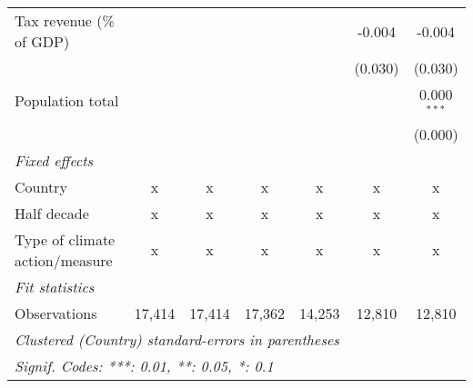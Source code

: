\begin{tabular}{lcccccc}
   Tax revenue (\% of GDP)                              &         &         &         &                & -0.004         & -0.004\\   
                                                        &         &         &         &                & (0.030)        & (0.030)\\   
   Population total                                     &         &         &         &                &                & 0.000$^{***}$\\   
                                                        &         &         &         &                &                & (0.000)\\   
   \emph{Fixed effects}\\
   Country                                              & x       & x       & x       & x              & x              & x\\  
   Half decade                                          & x       & x       & x       & x              & x              & x\\  
   Type of climate action/measure                       & x       & x       & x       & x              & x              & x\\  
   \midrule \emph{Fit statistics}\\
   Observations                                         & 17,414  & 17,414  & 17,362  & 14,253         & 12,810         & 12,810\\  
   \midrule
   \multicolumn{7}{l}{\emph{Clustered (Country) standard-errors in parentheses}}\\
   \multicolumn{7}{l}{\emph{Signif. Codes: ***: 0.01, **: 0.05, *: 0.1}}\\
\end{tabular}
\par\endgroup



